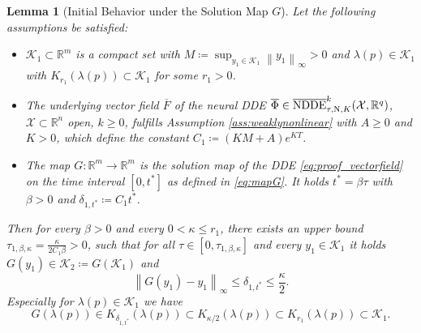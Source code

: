 \documentclass[10pt]{article}
\numberwithin{equation}{section}
\newtheorem{lemma}[theorem]{Lemma}
\newcommand\norm[1]{\left\lVert#1\right\rVert}
\begin{document}
	
	\begin{lemma}[Initial Behavior under the Solution Map $G$] \label{lem:mapG}
		Let the following assumptions be satisfied:
		\begin{itemize}
			\item $\mathcal{K}_1 \subset \mathbb{R}^m$ is a compact set with $M \coloneqq \sup_{y_1 \in \mathcal{K}_1} \norm{y_1}_\infty>0$ and $\lambda(p)\in \mathcal{K}_1$ with $K_{r_1}(\lambda(p))\subset \mathcal{K}_1$ for some $r_1 >0$.
			\item The underlying vector field $\overline{F}$ of the neural DDE $\overline{\Phi}\in\overline{\textup{NDDE}}^k_{\tau,\textup{N},K}(\mathcal{X},\mathbb{R}^q)$, $\mathcal{X}\subset \mathbb{R}^n$ open, $k \geq 0$, fulfills Assumption \ref{ass:weaklynonlinear} with $A\geq 0$ and $K>0$, which define the constant $C_1 \coloneqq (KM+A)e^{KT}$.
			\item The map $G: \mathbb{R}^m\rightarrow \mathbb{R}^m$ is the solution map of the DDE \eqref{eq:proof_vectorfield} on the time interval $[0,t^\ast]$ as defined in \eqref{eq:mapG}. It holds $t^\ast = \beta \tau$ with $\beta>0$ and  $\delta_{1,t^\ast} \coloneqq C_1 t^\ast$.
		\end{itemize}
		Then for every $\beta>0$ and every $0<\kappa\leq r_1$, there exists an upper bound $\tau_{1,\beta,\kappa}=\frac{\kappa}{2C_1 \beta}>0$, such that for all $\tau \in [0,\tau_{1,\beta,\kappa}]$ and every $y_1\in \mathcal{K}_1$ it holds $G(y_1)\in\mathcal{K}_2\coloneqq G(\mathcal{K}_1)$ and
		\begin{equation*}
			\norm{G(y_1)-y_1}_\infty \leq \delta_{1,t^\ast} \leq \frac{\kappa}{2}.
		\end{equation*}
		Especially for $\lambda(p)\in \mathcal{K}_1$ we have
		\begin{equation*}
			G(\lambda(p))\in K_{\delta_{1,t^\ast}}(\lambda(p)) \subset K_{\kappa/2}(\lambda(p)) \subset K_{r_1}(\lambda(p)) \subset \mathcal{K}_1.
		\end{equation*}
	\end{lemma}
	
\end{document}
